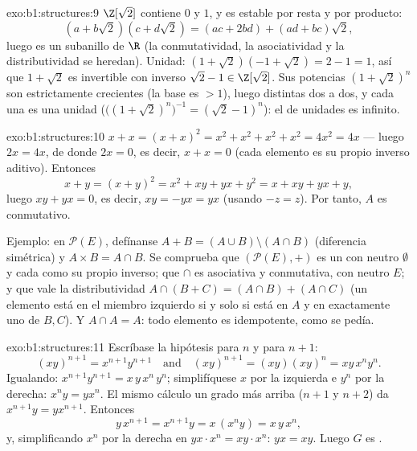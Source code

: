 \begin{solution}{exo:b1:structures:9}
$\Z[\sqrt 2]$ contiene $0$ y $1$, y es estable por resta y por
producto:
\[
(a + b\sqrt 2)(c + d\sqrt 2) = (ac + 2bd) + (ad + bc)\sqrt 2 ,
\]
luego es un subanillo de $\R$ (la conmutatividad, la asociatividad y la
distributividad se heredan). Unidad: $(1 + \sqrt 2)(-1 + \sqrt 2) =
2 - 1 = 1$, así que $1 + \sqrt 2$ es invertible con inverso
$\sqrt 2 - 1 \in \Z[\sqrt 2]$. Sus potencias $(1 + \sqrt 2)^n$ son
estrictamente crecientes (la base es $> 1$), luego distintas dos a
dos, y cada una es una unidad
($\bigl((1+\sqrt2)^n\bigr)^{-1} = (\sqrt 2 - 1)^n$): el  de
unidades es infinito.
\end{solution}

\begin{solution}{exo:b1:structures:10}
$x + x = (x + x)^2 = x^2 + x^2 + x^2 + x^2 = 4x^2 = 4x$ --- luego
$2x = 4x$, de donde $2x = 0$, es decir, $x + x = 0$ (cada elemento es
su propio inverso aditivo). Entonces
\[
x + y = (x+y)^2 = x^2 + xy + yx + y^2 = x + xy + yx + y ,
\]
luego $xy + yx = 0$, es decir, $xy = -yx = yx$ (usando $-z = z$). Por
tanto, $A$ es conmutativo.

Ejemplo: en $\mathcal{P}(E)$, defínanse $A + B = (A \cup B) \setminus
(A \cap B)$ (diferencia simétrica) y $A \times B = A \cap B$. Se
comprueba que $(\mathcal{P}(E), +)$ es un  con neutro
$\emptyset$ y cada  como su propio inverso; que $\cap$ es
asociativa y conmutativa, con neutro $E$; y que vale la
distributividad $A \cap (B + C) = (A \cap B) + (A \cap C)$ (un
elemento está en el miembro izquierdo si y solo si está en $A$ y en
exactamente uno de $B, C$). Y $A \cap A = A$: todo elemento es
idempotente, como se pedía.
\end{solution}

\begin{solution}{exo:b1:structures:11}
Escríbase la hipótesis para $n$ y para $n+1$:
\[
(xy)^{n+1} = x^{n+1} y^{n+1}
\quad\text{and}\quad
(xy)^{n+1} = (xy)(xy)^n = xy\,x^n y^n .
\]
Igualando: $x^{n+1} y^{n+1} = x\,y\,x^n\,y^n$; simplifíquese $x$ por la
izquierda e $y^n$ por la derecha: $x^n y = y x^n$. El mismo cálculo un
grado más arriba ($n+1$ y $n+2$) da $x^{n+1} y = y x^{n+1}$. Entonces
\[
y\,x^{n+1} = x^{n+1} y = x\,(x^n y) = x\,y\,x^n ,
\]
y, simplificando $x^n$ por la derecha en $y x \cdot x^n = x y \cdot x^n$:
$yx = xy$. Luego $G$ es .
\end{solution}

